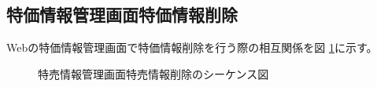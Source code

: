 \documentclass[a4j]{jarticle}
\begin{document}
\subsection{特価情報管理画面特価情報削除}
Webの特価情報管理画面で特価情報削除を行う際の相互関係を図 \ref {tab:oonishi25}に示す。
\begin{figure}[H]
\begin{center}
\caption{特売情報管理画面特売情報削除のシーケンス図}
\label{tab:oonishi25}
\end{center}
\end{figure}
\end{document}
